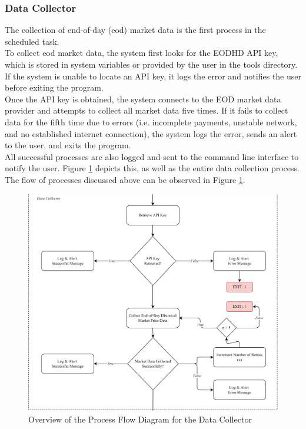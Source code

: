 \subsubsection{Data Collector}
\label{subsubsec:data_collector}
The collection of end-of-day (eod) market data is the first process in the scheduled task.
\hfill \\
To collect eod market data, the system first looks for the EODHD API key, 
which is stored in system variables or provided by the user in the tools directory. 
If the system is unable to locate an API key, it logs the error and notifies the user before 
exiting the program.
\hfill \\
Once the API key is obtained, the system connects to the EOD market data provider and 
attempts to collect all market data five times. If it fails to collect data 
for the fifth time due to errors (i.e. incomplete payments, unstable network, and no established internet connection), 
the system logs the error, sends an alert to the user, and exits the program.
\hfill \\
All successful processes are also logged and sent to the command line interface to notify the user. 
Figure \ref{fig:process_flowchart_data_collector} depicts this, as well as the entire data collection process.
\hfill \\
The flow of processes discussed above can be observed in Figure \ref{fig:process_flowchart_data_collector}.
\begin{figure}[ht]
    \centering
    \includegraphics[width=1\textwidth]{./assets/Chapter_3/PFC/ProcessFlowchart_DataCollector.png}
    \caption{Overview of the Process Flow Diagram for the Data Collector}
    \label{fig:process_flowchart_data_collector}
\end{figure}
\FloatBarrier

